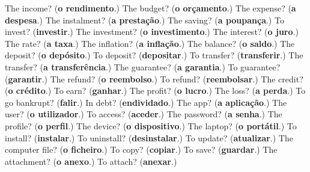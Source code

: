 \begin{tcolorbox}[breakable,colback=teal!4,colframe=teal!35!black,title={Before you move on}]
The income? (\textbf{o rendimento}.) The budget? (\textbf{o orçamento}.) The expense? (\textbf{a despesa}.) The instalment? (\textbf{a prestação}.) The saving? (\textbf{a poupança}.) To invest? (\textbf{investir}.) The investment? (\textbf{o investimento}.) The interest? (\textbf{o juro}.) The rate? (\textbf{a taxa}.) The inflation? (\textbf{a inflação}.) The balance? (\textbf{o saldo}.) The deposit? (\textbf{o depósito}.) To deposit? (\textbf{depositar}.) To transfer? (\textbf{transferir}.) The transfer? (\textbf{a transferência}.) The guarantee? (\textbf{a garantia}.) To guarantee? (\textbf{garantir}.) The refund? (\textbf{o reembolso}.) To refund? (\textbf{reembolsar}.) The credit? (\textbf{o crédito}.) To earn? (\textbf{ganhar}.) The profit? (\textbf{o lucro}.) The loss? (\textbf{a perda}.) To go bankrupt? (\textbf{falir}.) In debt? (\textbf{endividado}.) The app? (\textbf{a aplicação}.) The user? (\textbf{o utilizador}.) To access? (\textbf{aceder}.) The password? (\textbf{a senha}.) The profile? (\textbf{o perfil}.) The device? (\textbf{o dispositivo}.) The laptop? (\textbf{o portátil}.) To install? (\textbf{instalar}.) To uninstall? (\textbf{desinstalar}.) To update? (\textbf{atualizar}.) The computer file? (\textbf{o ficheiro}.) To copy? (\textbf{copiar}.) To save? (\textbf{guardar}.) The attachment? (\textbf{o anexo}.) To attach? (\textbf{anexar}.)
\end{tcolorbox}
